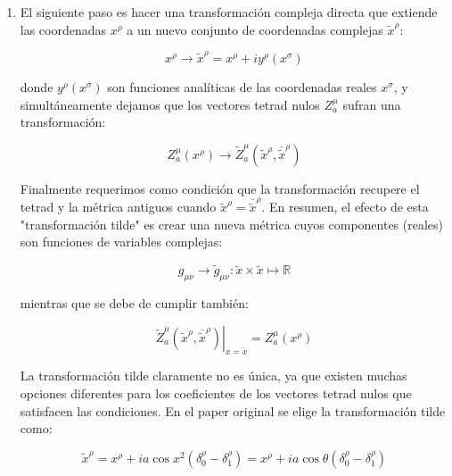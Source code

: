 \begin{enumerate}[1.]
    \item El siguiente paso es hacer una transformación compleja directa que extiende las coordenadas $x^\rho$ a un nuevo conjunto de coordenadas complejas $\tilde{x}^\rho$:

          \begin{equation}
              x^\rho \rightarrow \tilde{x}^\rho = x^\rho + i y^\rho(x^\sigma)
          \end{equation}

          donde $y^\rho(x^\sigma)$ son funciones analíticas de las coordenadas reales $x^\sigma$, y simultáneamente dejamos que los vectores tetrad nulos $Z_a^\mu$ sufran una transformación:

          \begin{equation}
              Z_a^\mu(x^\rho) \rightarrow \tilde{Z}_a^\mu(\tilde{x}^\rho, \overline{\tilde{x}}^\rho)
          \end{equation}

          Finalmente requerimos como condición que la transformación recupere el tetrad y la métrica antiguos cuando $\tilde{x}^\rho = \overline{\tilde{x}}^\rho$. En resumen, el efecto de esta "transformación tilde" es crear una nueva métrica cuyos componentes (reales) son funciones de variables complejas:

          \begin{equation}
              g_{\mu \nu} \rightarrow \tilde{g}_{\mu \nu}: \tilde{x} \times \tilde{x} \mapsto \mathbb{R}
          \end{equation}

          mientras que se debe de cumplir también:

          \begin{equation}
              \left. \tilde{Z}_a^\mu(\tilde{x}^\rho, \overline{\tilde{x}}^\rho) \right|_{\overline{x} = \tilde{x}} = Z_a^\mu(x^\rho)
          \end{equation}

          La transformación tilde claramente no es única, ya que existen muchas opciones diferentes para los coeficientes de los vectores tetrad nulos que satisfacen las condiciones. En el paper original \cite{newman-1965} se elige la transformación tilde como:

          \begin{equation}
              \tilde{x}^\rho = x^\rho + i a \cos x^2 (\delta_0^\rho - \delta_1^\rho) = x^\rho + i a \cos \theta (\delta_0^\rho - \delta_1^\rho)
          \end{equation}


\end{enumerate}
